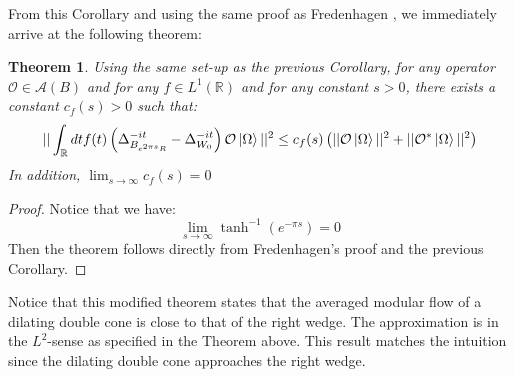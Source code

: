 \documentclass[a4paper,11pt]{article}
\newtheorem{theorem}{Theorem}
\theoremstyle{definition}
\newcommand{\lb}{\left(}
\newcommand{\rb}{\right)}
\begin{document}
From this Corollary and using the same proof as Fredenhagen \cite{fredenhagen}, we immediately arrive at the following theorem:
\begin{theorem}\label{theorem:modifiedfredenhagen}
    Using the same set-up as the previous Corollary, for any operator $\mathcal{O}\in \mathcal{A}(B)$ and for any $f\in L^1(\mathbb{R})$ and for any constant $s > 0$, there exists a constant $c_f(s) > 0$ such that:
    \begin{equation}
        ||\int_\mathbb{R} dt f(t)\lb\Delta^{-it}_{B_{e^{2\pi s}R}} - \Delta^{-it}_{W_0}\rb\mathcal{O}\ket{\Omega}||^2 \leq c_f(s)\lb||\mathcal{O}\ket{\Omega}||^2 + ||\mathcal{O}^*\ket{\Omega}||^2\rb
    \end{equation}
    In addition, $\lim_{s\rightarrow \infty}c_f(s) = 0$
\end{theorem}
\begin{proof}
    Notice that we have:
    \begin{equation}
        \lim_{s\rightarrow\infty}\tanh^{-1}(e^{-\pi s}) = 0
    \end{equation}
    Then the theorem follows directly from Fredenhagen's proof and the previous Corollary.
\end{proof}
Notice that this modified theorem states that the averaged modular flow  of a dilating double cone is close to that of the right wedge. The approximation is in the $L^2$-sense as specified in the Theorem above. This result matches the intuition since the dilating double cone approaches the right wedge.
\end{document}
